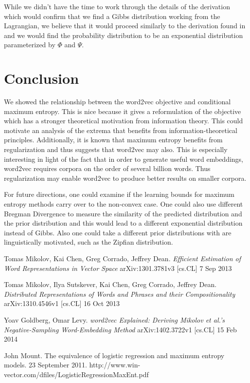 \documentclass[]{article}
\begin{document}
While we didn't have the time to work through the details of the derivation which would confirm that we find a Gibbs distribution working from the Lagrangian, we believe that it would proceed similarly to the derivation found in \cite{logregmaxent} and we would find the probability distribution to be an exponential distribution parameterized by $\Phi$ and $\Psi$.

\section{Conclusion}

We showed the relationship between the word2vec objective and conditional maximum entropy. This is nice because it gives a reformulation of the objective which has a stronger theoretical motivation from information theory. This could motivate an analysis of the extrema that benefits from information-theoretical principles. Additionally, it is known that maximum entropy benefits from regularization and thus suggests that word2vec may also. This is especially interesting in light of the fact that in order to generate useful word embeddings, word2vec requires corpora on the order of several billion words. Thus regularization may enable word2vec to produce better results on smaller corpora.

For future directions, one could examine if the learning bounds for maximum entropy methods carry over to the non-convex case. One could also use different Bregman Divergence to measure the similarity of the predicted distribution and the prior distribution and this would lead to a different exponential distribution instead of Gibbs. Also one could take a different prior distributions with are linguistically motivated, such as the Zipfian distribution.

\begin{thebibliography}{1}
	 Tomas Mikolov, Kai Chen, Greg Corrado, Jeffrey Dean. {\em Efficient Estimation of Word Representations in Vector Space} arXiv:1301.3781v3 [cs.CL] 7 Sep 2013
	
	 Tomas Mikolov, Ilya Sutskever, Kai Chen, Greg Corrado, Jeffrey Dean. {\em Distributed Representations of Words and Phrases and their Compositionality} arXiv:1310.4546v1  [cs.CL]  16 Oct 2013
	
	 Yoav Goldberg, Omar Levy. {\em word2vec Explained: Deriving Mikolov et al.'s Negative-Sampling Word-Embedding Method} arXiv:1402.3722v1  [cs.CL]  15 Feb 2014
	
	 John Mount. The equivalence of logistic regression and maximum entropy
	models. 23 September 2011. http://www.win-vector.com/dfiles/LogisticRegressionMaxEnt.pdf
	
\end{thebibliography}
\end{document}
